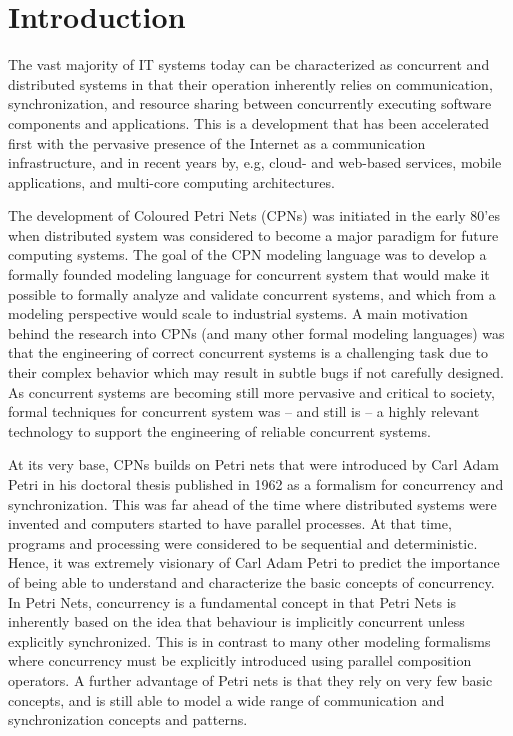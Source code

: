 \section{Introduction}

The vast majority of IT systems today can be characterized as
concurrent and distributed systems in that their operation inherently
relies on communication, synchronization, and resource sharing between
concurrently executing software components and applications. This is a
development that has been accelerated first with the pervasive
presence of the Internet as a communication infrastructure, and in
recent years by, e.g, cloud- and web-based services, mobile
applications, and multi-core computing architectures.


The development of Coloured Petri Nets (CPNs) was initiated in the
early 80'es when distributed system was considered to become a major
paradigm for future computing systems. The goal of the CPN modeling
language was to develop a formally founded modeling language for
concurrent system that would make it possible to formally analyze and
validate concurrent systems, and which from a modeling perspective
would scale to industrial systems. A main motivation behind the
research into CPNs (and many other formal modeling languages) was that
the engineering of correct concurrent systems is a challenging task
due to their complex behavior which may result in subtle bugs if not
carefully designed. As concurrent systems are becoming still more
pervasive and critical to society, formal techniques for concurrent
system was -- and still is -- a highly relevant technology to support
the engineering of reliable concurrent systems.


At its very base, CPNs builds on Petri nets that were introduced by
Carl Adam Petri in his doctoral thesis published in 1962
\cite{capetri:thesis} as a formalism for concurrency and
synchronization. This was far ahead of the time where distributed
systems were invented and computers started to have parallel
processes. At that time, programs and processing were considered to be
sequential and deterministic. Hence, it was extremely visionary of
Carl Adam Petri to predict the importance of being able to understand
and characterize the basic concepts of concurrency. In Petri Nets,
concurrency is a fundamental concept in that Petri Nets is inherently
based on the idea that behaviour is implicitly concurrent unless
explicitly synchronized. This is in contrast to many other modeling
formalisms where concurrency must be explicitly introduced using
parallel composition operators. A further advantage of Petri nets is
that they rely on very few basic concepts, and is still able to model
a wide range of communication and synchronization concepts and
patterns. 

